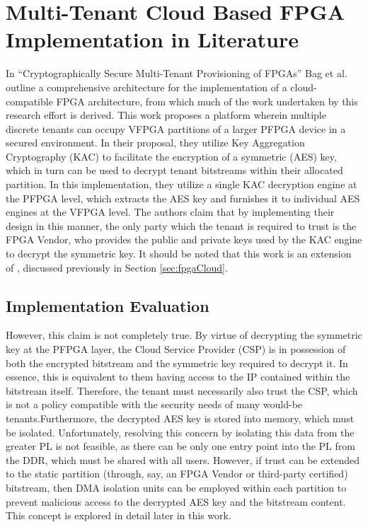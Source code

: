 \section{Multi-Tenant Cloud Based FPGA Implementation in Literature}\label{sec:LitImpl}
In ``Cryptographically Secure Multi-Tenant Provisioning of FPGAs''\cite{bag_cryptographically_2020} Bag et al. outline a comprehensive architecture for the implementation of a cloud-compatible FPGA architecture, from which much of the work undertaken by this research effort is derived. This work proposes a platform wherein multiple discrete tenants can occupy VFPGA partitions of a larger PFPGA device in a secured environment. In their proposal, they utilize Key Aggregation Cryptography (KAC) to facilitate the encryption of a symmetric (AES) key, which in turn can be used to decrypt tenant bitstreams within their allocated partition. In this implementation, they utilize a single KAC decryption engine at the PFPGA level, which extracts the AES key and furnishes it to individual AES engines at the VFPGA level. The authors claim that by implementing their design in this manner, the only party which the tenant is required to trust is the FPGA Vendor, who provides the public and private keys used by the KAC engine to decrypt the symmetric key. It should be noted that this work is an extension of \cite{chen_enabling_2014}, discussed previously in Section \ref{sec:fpgaCloud}.


\subsection{Implementation Evaluation}\label{subsec:LitEval}
However, this claim is not completely true. By virtue of decrypting the symmetric key at the PFPGA layer, the Cloud Service Provider (CSP) is in possession of both the encrypted bitstream and the symmetric key required to decrypt it. In essence, this is equivalent to them having access to the IP contained within the bitstream itself. Therefore, the tenant must necessarily also trust the CSP, which is not a policy compatible with the security needs of many would-be tenants.Furthermore, the decrypted AES key is stored into memory, which must be isolated. Unfortunately, resolving this concern by isolating this data from the greater PL is not feasible, as there can be only one entry point into the PL from the DDR, which must be shared with all users. However, if trust can be extended to the static partition (through, say, an FPGA Vendor or third-party certified) bitstream, then DMA isolation units can be employed within each partition to prevent malicious access to the decrypted AES key and the bitstream content. This concept is explored in detail later in this work.


